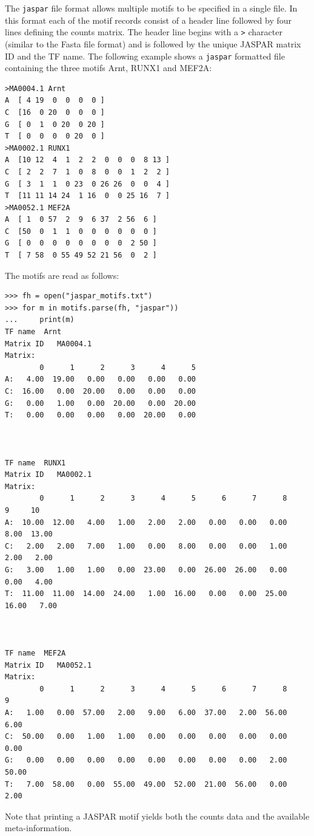 \documentclass{report}
\begin{document}
The \verb+jaspar+ file format allows multiple motifs to be specified in a single file. In this format each of the motif records consist of a header line followed by four lines defining the counts matrix. The header line begins with a \verb+>+ character (similar to the Fasta file format) and is followed by the unique JASPAR matrix ID and the TF name. The following example shows a \verb+jaspar+ formatted file containing the three motifs Arnt, RUNX1 and MEF2A:
\begin{verbatim}
>MA0004.1 Arnt
A  [ 4 19  0  0  0  0 ]
C  [16  0 20  0  0  0 ]
G  [ 0  1  0 20  0 20 ]
T  [ 0  0  0  0 20  0 ]
>MA0002.1 RUNX1
A  [10 12  4  1  2  2  0  0  0  8 13 ]
C  [ 2  2  7  1  0  8  0  0  1  2  2 ]
G  [ 3  1  1  0 23  0 26 26  0  0  4 ]
T  [11 11 14 24  1 16  0  0 25 16  7 ]
>MA0052.1 MEF2A
A  [ 1  0 57  2  9  6 37  2 56  6 ]
C  [50  0  1  1  0  0  0  0  0  0 ]
G  [ 0  0  0  0  0  0  0  0  2 50 ]
T  [ 7 58  0 55 49 52 21 56  0  2 ]
\end{verbatim}
The motifs are read as follows:
\begin{verbatim}
>>> fh = open("jaspar_motifs.txt")
>>> for m in motifs.parse(fh, "jaspar"))
...     print(m)
TF name	 Arnt
Matrix ID	MA0004.1
Matrix:
        0      1      2      3      4      5
A:   4.00  19.00   0.00   0.00   0.00   0.00
C:  16.00   0.00  20.00   0.00   0.00   0.00
G:   0.00   1.00   0.00  20.00   0.00  20.00
T:   0.00   0.00   0.00   0.00  20.00   0.00



TF name	 RUNX1
Matrix ID	MA0002.1
Matrix:
        0      1      2      3      4      5      6      7      8      9     10
A:  10.00  12.00   4.00   1.00   2.00   2.00   0.00   0.00   0.00   8.00  13.00
C:   2.00   2.00   7.00   1.00   0.00   8.00   0.00   0.00   1.00   2.00   2.00
G:   3.00   1.00   1.00   0.00  23.00   0.00  26.00  26.00   0.00   0.00   4.00
T:  11.00  11.00  14.00  24.00   1.00  16.00   0.00   0.00  25.00  16.00   7.00



TF name	 MEF2A
Matrix ID	MA0052.1
Matrix:
        0      1      2      3      4      5      6      7      8      9
A:   1.00   0.00  57.00   2.00   9.00   6.00  37.00   2.00  56.00   6.00
C:  50.00   0.00   1.00   1.00   0.00   0.00   0.00   0.00   0.00   0.00
G:   0.00   0.00   0.00   0.00   0.00   0.00   0.00   0.00   2.00  50.00
T:   7.00  58.00   0.00  55.00  49.00  52.00  21.00  56.00   0.00   2.00
\end{verbatim}

Note that printing a JASPAR motif yields both the counts data and the available meta-information.
\end{document}
